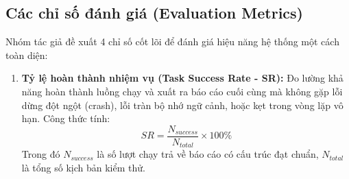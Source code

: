 \documentclass[11pt,a4paper]{article}
\begin{document}
\begin{itemize}
\subsection{Các chỉ số đánh giá (Evaluation Metrics)}
Nhóm tác giả đề xuất 4 chỉ số cốt lõi để đánh giá hiệu năng hệ thống một cách toàn diện:
\begin{enumerate}
    \item \textbf{Tỷ lệ hoàn thành nhiệm vụ (Task Success Rate - SR):} Đo lường khả năng hoàn thành luồng chạy và xuất ra báo cáo cuối cùng mà không gặp lỗi dừng đột ngột (crash), lỗi tràn bộ nhớ ngữ cảnh, hoặc kẹt trong vòng lặp vô hạn. Công thức tính:
    \begin{equation}
        SR = \frac{N_{success}}{N_{total}} \times 100\%
    \end{equation}
    Trong đó $N_{success}$ là số lượt chạy trả về báo cáo có cấu trúc đạt chuẩn, $N_{total}$ là tổng số kịch bản kiểm thử.
    

\end{enumerate}
\end{itemize}
\end{document}
